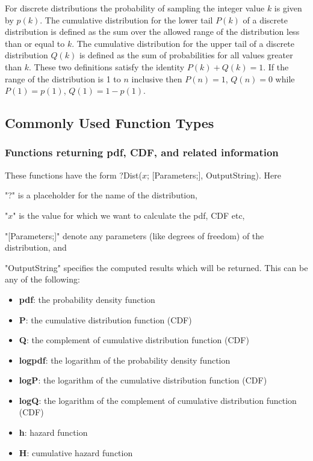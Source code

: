 For discrete distributions the probability of sampling the integer value $k$ is given by $p(k)$. The cumulative distribution for the lower tail $P(k)$ of a discrete distribution is defined as the sum over the allowed range of the distribution less than or equal to $k$. The cumulative distribution for the upper tail of a discrete distribution $Q(k)$ is defined as the sum of probabilities for all values greater than $k$. These two definitions satisfy the identity $P(k) + Q(k) = 1$. If the range of the distribution is 1 to $n$ inclusive then $P(n) = 1$, $Q(n) = 0$ while $P(1) = p(1)$, $Q(1) = 1 - p(1)$. 


\newpage
\subsection{Commonly Used Function Types}
\label{Commonly Used Distribution Function Types}

\subsubsection{Functions returning pdf, CDF, and related information}
\label{Functions returning pdf, CDF, and related information}
These functions have the form \textsf{?Dist($x$; [Parameters;], OutputString)}.
Here 

"?" is a placeholder for the name of the distribution, 

"$x$" is the value for which we want to calculate the pdf, CDF etc, 

"[Parameters;]" denote any parameters (like degrees of freedom) of the distribution, and 

"OutputString" specifies the computed results which will be returned. This can be any of the following:

\begin{itemize}
	\item \textbf{pdf}: the probability density function
	\item \textbf{P}: the cumulative distribution function (CDF)
	\item \textbf{Q}: the complement of cumulative distribution function (CDF)
	\item \textbf{logpdf}: the logarithm of the probability density function
	\item \textbf{logP}: the logarithm of the cumulative distribution function (CDF)
	\item \textbf{logQ}: the logarithm of the complement of cumulative distribution function (CDF)
	\item \textbf{h}: hazard function
	\item \textbf{H}: cumulative hazard function
\end{itemize}


